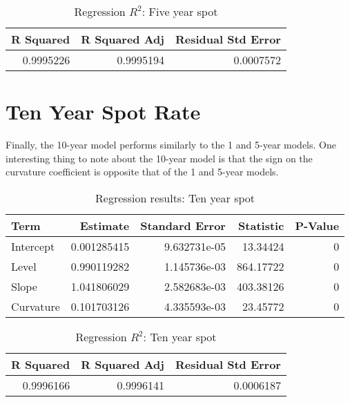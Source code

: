 \documentclass[openany]{book}
\theoremstyle{definition}
\theoremstyle{definition}
\theoremstyle{definition}
\theoremstyle{remark}
\begin{document}
\normalsize

\small

\begin{table}[H]

\caption{\label{tab:five-year-reg-r2}Regression $R^2$: Five year spot}
\centering
\begin{tabular}[t]{rrr}
\toprule
R Squared & R Squared Adj & Residual Std Error\\
\midrule
0.9995226 & 0.9995194 & 0.0007572\\
\bottomrule
\end{tabular}
\end{table}

\normalsize

\hypertarget{ten-year-spot-rate}{%
\section{Ten Year Spot Rate}\label{ten-year-spot-rate}}

Finally, the 10-year model performs similarly to the 1 and 5-year
models. One interesting thing to note about the 10-year model is that
the sign on the curvature coefficient is opposite that of the 1 and
5-year models.

\small

\begin{table}[H]

\caption{\label{tab:ten-year-reg}Regression results: Ten year spot}
\centering
\begin{tabular}[t]{lrrrr}
\toprule
Term & Estimate & Standard Error & Statistic & P-Value\\
\midrule
Intercept & 0.001285415 & 9.632731e-05 & 13.34424 & 0\\
Level & 0.990119282 & 1.145736e-03 & 864.17722 & 0\\
Slope & 1.041806029 & 2.582683e-03 & 403.38126 & 0\\
Curvature & 0.101703126 & 4.335593e-03 & 23.45772 & 0\\
\bottomrule
\end{tabular}
\end{table}

\normalsize

\small

\begin{table}[H]

\caption{\label{tab:ten-year-reg-r2}Regression $R^2$: Ten year spot}
\centering
\begin{tabular}[t]{rrr}
\toprule
R Squared & R Squared Adj & Residual Std Error\\
\midrule
0.9996166 & 0.9996141 & 0.0006187\\
\bottomrule
\end{tabular}
\end{table}
\end{document}
